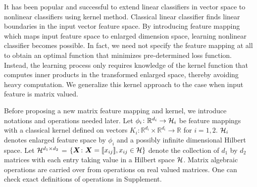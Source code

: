 \documentclass[12pt]{article}
\begin{document}
It has been popular and successful to extend linear classifiers in vector space to nonlinear classifiers using kernel method. Classical linear classifier finds linear boundaries in the input vector feature space. By introducing feature mapping which maps input feature space to enlarged dimension space, learning nonlinear classifier becomes possible. In fact, we need not specify the feature mapping at all to obtain an optimal function that minimizes pre-determined loss function. Instead, the learning process only requires knowledge of the kernel function that computes inner products in the transformed enlarged space, thereby avoiding heavy computation. We generalize this kernel approach to the case when input feature is matrix valued.


Before proposing a new matrix feature mapping and kernel, we introduce notations and operations needed later. Let $\phi_i\colon\mathbb{R}^{d_i}\rightarrow \mathcal{H}_i$ be feature mappings with a classical kernel defined on vectors $K_i\colon\mathbb{R}^{d_i}\times \mathbb{R}^{d_i}\rightarrow \mathbb{R}$ for $i = 1,2.$ $\mathcal{H}_i$ denotes enlarged feature space by $\phi_i$ and a possibly infinite dimensional Hilbert space.  Let $\mathcal{H}^{d_1\times d_2}$ = $\{\bm X\colon\bm X = \llbracket x_{ij} \rrbracket,x_{ij}\in\mathcal{H}\}$ denote the collection of $d_1$ by $d_2$ matrices with each entry taking value in a Hilbert space $\mathcal{H}$.   Matrix algebraic operations are carried over from operations on real valued matrices. One can check exact definitions of operations in Supplement.
\end{document}
